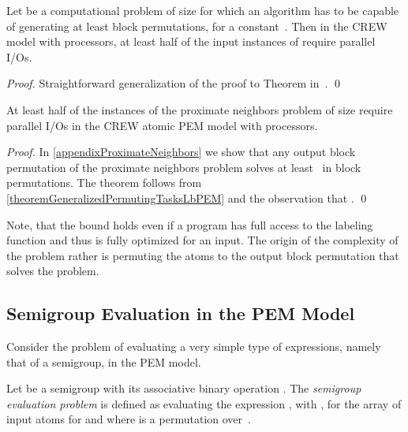 \documentclass[envcountsame]{llncs}
\def\bOm#1{\printmath{\Omega \left(#1\right)}}
\begin{document}
\begin{lemma}\label{theoremGeneralizedPermutingTasksLbPEM}
Let \permutationProblem be a computational problem of size  for which an algorithm has to be capable of generating at least  block permutations, for a constant~\mbox{}. 
Then in the CREW \movePEM model with  processors, at least half of the input instances of \permutationProblem require \bOm{\permp{\inputSize,M,B}} parallel I/Os. \end{lemma}

\begin{proof}
Straightforward generalization of the proof to Theorem  in~\cite{2012ThesisGero}.
\qed
\end{proof}

\begin{theorem}\label{lemmaProximateNeighborsLbPEM} 
At least half of the instances of the proximate neighbors problem of size  require \bOm{\permp{\inputSize,\memorySize,\blockSize}} parallel I/Os in the CREW atomic PEM model with  processors. 
\end{theorem}
\begin{proof}
In \autoref{appendixProximateNeighbors} we show that any output block permutation of the proximate neighbors problem solves at least~ in block permutations.
The theorem follows from \autoref{theoremGeneralizedPermutingTasksLbPEM} and the observation that . \qed
\end{proof}
Note, that the bound holds even if a program has full access to the labeling function  and thus is fully optimized for an input.
The origin of the complexity of the problem rather is permuting the atoms to the output block permutation that solves the problem.

\subsection{Semigroup Evaluation in the PEM Model}
\label{sectionSemigroupLB}



Consider the problem of evaluating a very simple type of expressions, namely that of a semigroup, in the PEM model.


\begin{definition}
\label{definitionSemigroupEvaluation} 
Let \semigroup be a semigroup with its associative binary operation .
The \emph{semigroup evaluation problem} is defined as evaluating the expression , with , for the array of input atoms  for  and where  is a permutation over~.
\end{definition}
\end{document}
